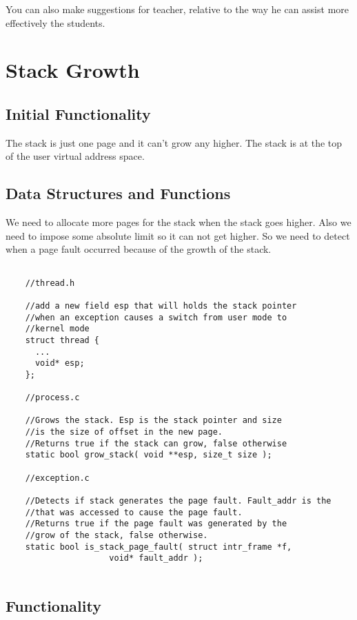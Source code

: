 You can also make suggestions for teacher, relative to the way he can assist more effectively the students.

\section{Stack Growth}
\subsection{Initial Functionality}

The stack is just one page and it can't grow any higher. The stack is at the top of the user
virtual address space.

\subsection{Data Structures and Functions}

We need to allocate more pages for the stack when the stack goes higher. Also we need to
impose some absolute limit so it can not get higher. So we need to detect when a page fault occurred because of the growth of the stack. 

\begin{lstlisting} 

	//thread.h

	//add a new field esp that will holds the stack pointer
	//when an exception causes a switch from user mode to
	//kernel mode
	struct thread {
	  ...
	  void* esp;
	};

	//process.c

	//Grows the stack. Esp is the stack pointer and size
	//is the size of offset in the new page.
	//Returns true if the stack can grow, false otherwise
	static bool grow_stack( void **esp, size_t size );

	//exception.c

	//Detects if stack generates the page fault. Fault_addr is the 
	//that was accessed to cause the page fault.
	//Returns true if the page fault was generated by the
	//grow of the stack, false otherwise.
	static bool is_stack_page_fault( struct intr_frame *f, 
					 void* fault_addr ); 
	
\end{lstlisting}


\subsection{Functionality}
 
